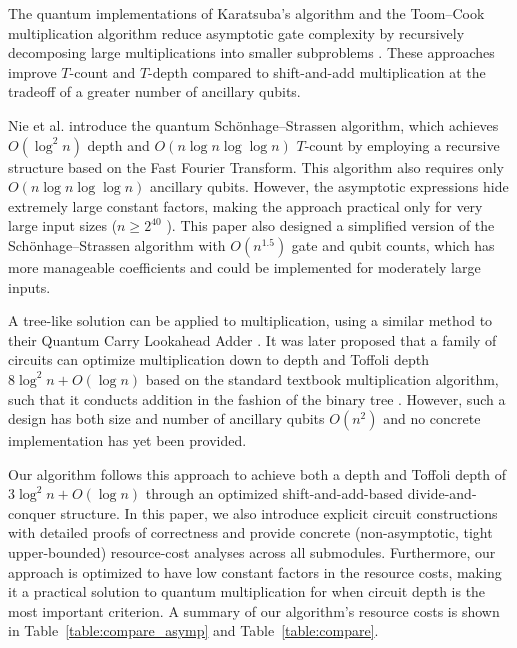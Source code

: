 \documentclass[reprint,amsmath,amssymb,aps,pra]{revtex4-2}
\begin{document}
The quantum implementations of Karatsuba's algorithm and the Toom--Cook multiplication algorithm reduce asymptotic gate complexity by recursively decomposing large multiplications into smaller subproblems \cite{parent2017improvedreversiblequantumcircuits, Putranto2023}. These approaches improve $T$-count and $T$-depth compared to shift-and-add multiplication at the tradeoff of a greater number of ancillary qubits.


Nie et al. \cite{Nie2023} introduce the quantum Schönhage--Strassen
algorithm, which achieves $O(\log^2 n)$ depth and $O(n\log n\log\log n)$ $T$-count by
employing a recursive structure based on the Fast Fourier Transform. This
algorithm also requires only $O(n\log n\log\log n)$ ancillary qubits. However,
the asymptotic expressions hide extremely large constant factors, making the
approach practical only for very large input sizes ($n \ge 2^{40}$
\cite{Nie2023}). 
This paper also designed a simplified version of the
Schönhage--Strassen algorithm with $O(n^{1.5})$ gate and qubit counts, which has
more manageable coefficients and could be implemented for moderately large
inputs. 

A tree-like solution can be applied to multiplication, using a similar method to their Quantum Carry Lookahead Adder \cite{Draper2004}. It was later proposed that a family of circuits can optimize multiplication down to depth and Toffoli depth $8\log^2{n}+O(\log{n})$ based on the standard textbook multiplication algorithm, such that it conducts addition in the fashion of the binary tree \cite{Nie2023}. However, such a design has both size and number of ancillary qubits $O(n^2)$ and no concrete implementation has yet been provided.

Our algorithm follows this approach to achieve both a depth and Toffoli depth of $3\log^2{n}+O(\log{n})$ through an optimized shift-and-add-based divide-and-conquer structure. In this paper, we also introduce explicit circuit constructions with detailed proofs of correctness and provide concrete (non-asymptotic, tight upper-bounded) resource-cost analyses across all submodules. Furthermore, our approach is optimized to have low constant factors in the resource costs, making it a practical solution to quantum multiplication for when circuit depth is the most important criterion. A summary of our algorithm's resource costs is shown in
Table~\ref{table:compare_asymp} and Table~\ref{table:compare}.
\end{document}
